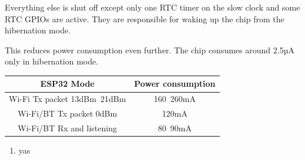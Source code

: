 \documentclass[a4paper ,12pt, onecolumn]{article}
\begin{document}
\begin{itemize}
    Everything else is shut off except only one RTC timer on the slow clock and some RTC GPIOs are active. They are responsible for waking up the chip from the hibernation mode.
    
    This reduces power consumption even further. The chip consumes around 2.5µA only in hibernation mode.

    \begin{center}
        \begin{tabular}{||c | c ||} 
        \hline
        ESP32 Mode & Power consumption  \\ [0.5ex] 
        \hline\hline
        Wi-Fi Tx packet 13dBm~21dBm & 160~260mA  \\ 
        \hline
        Wi-Fi/BT Tx packet 0dBm	 & 120mA  \\
        \hline
        Wi-Fi/BT Rx and listening & 80~90mA  \\
        \hline
       \end{tabular}
       \end{center}
\end{itemize}
\begin{enumerate}
    \item  yas
\end{enumerate}
\end{document}
